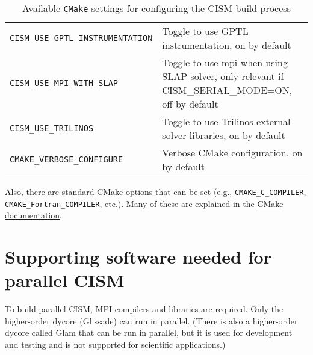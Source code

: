 \begin{table}
\begin{tabular}{ l | p{8cm} }
\texttt{CISM\_USE\_GPTL\_INSTRUMENTATION} & Toggle to use GPTL instrumentation, on by default \\

\texttt{CISM\_USE\_MPI\_WITH\_SLAP} & Toggle to use mpi when using SLAP solver, only relevant if CISM\_SERIAL\_MODE=ON, off by default \\

\texttt{CISM\_USE\_TRILINOS} & Toggle to use Trilinos external solver libraries, on by default \\

\texttt{CMAKE\_VERBOSE\_CONFIGURE} & Verbose CMake configuration, on by default \\







\hline
\end{tabular}
  \caption{Available \texttt{CMake} settings for configuring the CISM build process}
  \label{cmake-options}
\end{table}

Also, there are standard CMake options that can be set (e.g., \texttt{CMAKE\_C\_COMPILER}, \texttt{CMAKE\_Fortran\_COMPILER}, etc.).  Many of these are explained in the \href{http://www.cmake.org/Wiki/CMake_Useful_Variables}{CMake documentation}.



\section{Supporting software needed for parallel CISM}
To build parallel CISM, MPI compilers and libraries are required.  
Only the higher-order dycore (Glissade) can run in parallel.  (There is also a
higher-order dycore called Glam that can be run in parallel, but it is used
for development and testing and is not supported for scientific applications.)

